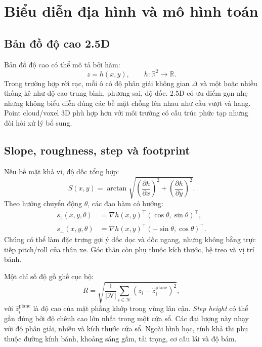 \documentclass[11pt,a4paper]{article}
\newcommand{\R}{\mathbb{R}}
\begin{document}
\section{Biểu diễn địa hình và mô hình toán}
\subsection{Bản đồ độ cao 2.5D}
Bản đồ độ cao có thể mô tả bởi hàm:
\begin{equation}
 z=h(x,y),\qquad h:\R^2\rightarrow\R.
 \label{eq:dem}
\end{equation}
Trong trường hợp rời rạc, mỗi ô có độ phân giải không gian \(\Delta\)
và một hoặc nhiều thống kê như độ cao trung bình, phương sai, độ dốc.
2.5D có ưu điểm gọn nhẹ nhưng không biểu diễn đúng các bề mặt
chồng lên nhau như cầu vượt và hang. Point cloud/voxel 3D phù hợp hơn
với môi trường có cấu trúc phức tạp nhưng đòi hỏi xử lý bổ sung.

\subsection{Slope, roughness, step và footprint}
Nếu bề mặt khả vi, độ dốc tổng hợp:
\begin{equation}
 S(x,y)=\arctan\!\sqrt{
  \left(\frac{\partial h}{\partial x}\right)^2+
  \left(\frac{\partial h}{\partial y}\right)^2}.
 \label{eq:slope}
\end{equation}
Theo hướng chuyển động \(\theta\), các đạo hàm có hướng:
\begin{align}
 s_{\parallel}(x,y,\theta)
    &=\nabla h(x,y)^\top(\cos\theta,\sin\theta)^\top,\\
 s_{\perp}(x,y,\theta)
    &=\nabla h(x,y)^\top(-\sin\theta,\cos\theta)^\top.
\end{align}
Chúng có thể làm đặc trưng gợi ý dốc dọc và dốc ngang,
nhưng không bằng trực tiếp pitch/roll của thân xe.
Góc thân còn phụ thuộc kích thước, hệ treo và vị trí bánh.

Một chỉ số độ gồ ghề cục bộ:
\begin{equation}
 R=\sqrt{\frac{1}{|\mathcal N|}\sum_{i\in\mathcal N}
    (z_i-\widehat z_i^{\mathrm{plane}})^2},
 \label{eq:rough}
\end{equation}
với \(\widehat z_i^{\mathrm{plane}}\) là độ cao của mặt phẳng
khớp trong vùng lân cận. \emph{Step height} có thể gần đúng bởi
độ chênh cao lớn nhất trong một cửa sổ. Các đại lượng này nhạy với
độ phân giải, nhiễu và kích thước cửa sổ.
Ngoài hình học, tính khả thi phụ thuộc đường kính bánh,
khoảng sáng gầm, tải trọng, cơ cấu lái và độ bám.
\end{document}
